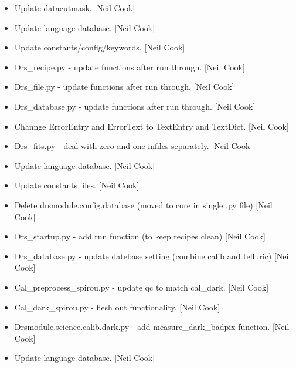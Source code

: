 \documentclass[a4paper,10pt,english]{report}
\begin{document}
\begin{itemize}
\item {} 
Update datacutmask. {[}Neil Cook{]}

\item {} 
Update language database. {[}Neil Cook{]}

\item {} 
Update constants/config/keywords. {[}Neil Cook{]}

\item {} 
Drs\_recipe.py - update functions after run through. {[}Neil Cook{]}

\item {} 
Drs\_file.py - update functions after run through. {[}Neil Cook{]}

\item {} 
Drs\_database.py - update functions after run through. {[}Neil Cook{]}

\item {} 
Channge ErrorEntry and ErrorText to TextEntry and TextDict. {[}Neil
Cook{]}

\item {} 
Drs\_fits.py - deal with zero and one infiles separately. {[}Neil Cook{]}

\item {} 
Update language database. {[}Neil Cook{]}

\item {} 
Update constants files. {[}Neil Cook{]}

\item {} 
Delete drsmodule.config.database (moved to core in single .py file)
{[}Neil Cook{]}

\item {} 
Drs\_startup.py - add run function (to keep recipes clean) {[}Neil Cook{]}

\item {} 
Drs\_database.py - update datebase setting (combine calib and telluric)
{[}Neil Cook{]}

\item {} 
Cal\_preprocess\_spirou.py - update qc to match cal\_dark. {[}Neil Cook{]}

\item {} 
Cal\_dark\_spirou.py - flesh out functionality. {[}Neil Cook{]}

\item {} 
Drsmodule.science.calib.dark.py - add measure\_dark\_badpix function.
{[}Neil Cook{]}

\item {} 
Update language database. {[}Neil Cook{]}


\end{itemize}
\end{document}
